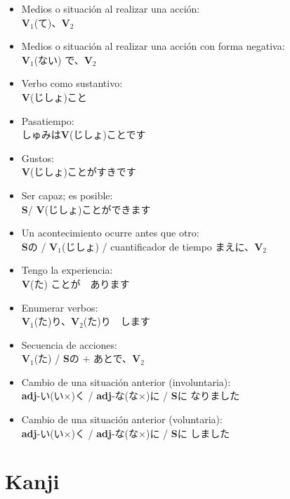 \documentclass[a4paper,12pt,oneside]{report}
\def\bv{\textbf{V}} %
\def\bs{\textbf{S}} %
\def\adj{\textbf{adj}} %
\def\vi{$\mathrm{\bv}_1$} %
\def\vn{$\mathrm{\bv}_2$} %
\newenvironment{changemargin}{%
 \begin{list}{}{%
\setlength{\textwidth}{\paperwidth}
\setlength{\textheight}{\paperheight}
   \setlength{\leftmargin}{-0.7in}%
   \setlength{\rightmargin}{0.4in}%
   \setlength{\listparindent}{\parindent}%
   \setlength{\itemindent}{\parindent}%
   \setlength{\parsep}{\parskip}%
 }%
\item[]%
}{\end{list}}
\begin{document}
\begin{CJK*}{UTF8}{min}
\begin{itemize}
          \bv(ない)なくてもいいです
    \item Medios o situación al realizar una acción:\\
          \vi(て)、\vn
    \item Medios o situación al realizar una acción con forma negativa:\\
          \vi(ない) で、\vn
    \item Verbo como sustantivo:\\
          \bv(じしょ)こと
    \item Pasatiempo:\\
          しゅみは\bv(じしょ)ことです
    \item Gustos:\\
          \bv(じしょ)ことがすきです
    \item Ser capaz; es posible:\\
          \bs / \bv(じしょ)ことができます
    \item Un acontecimiento ocurre antes que otro:\\
          \bs{の} / \vi(じしょ) / cuantificador de tiempo まえに、\vn
    \item Tengo la experiencia:\\
          \bv(た) ことが　あります
    \item Enumerar verbos:\\
          \vi(た)り、\vn(た)り　します
    \item Secuencia de acciones:\\
          \vi(た) / \bs {の} + あとで、\vn
    \item Cambio de una situaci\'on anterior (involuntaria):\\
          \adj-い(い×){く} / \adj-な(な×){に} / \bs{に} なりました
    \item Cambio de una situaci\'on anterior (voluntaria):\\
          \adj-い(い×){く} / \adj-な(な×){に} / \bs{に} しました
  \end{itemize}


\chapter{Kanji}
  \thispagestyle{contenido} %
  \pagestyle{contenido}     %

\begin{changemargin}


\end{changemargin}
\end{CJK*}
\end{document}
